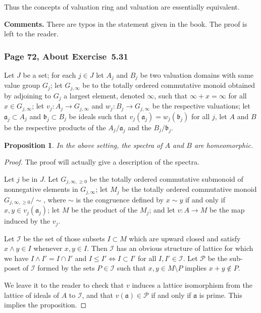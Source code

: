 \documentclass[12pt,letterpaper]{article}%
\newcommand{\mf}{\mathfrak}
\newcommand{\aaa}{\mf a}
\newcommand{\bbb}{\mf b}
\newcommand{\nn}{\noindent}
\newtheorem{prop}[thm]{Proposition}
\begin{document}
Thus the concepts of valuation ring and valuation are essentially equivalent.

\nn\textbf{Comments.} There are typos in the statement given in the book. The proof is left to the reader.

\subsubsection{Page 72, About Exercise~5.31}%

Let $J$ be a set; for each $j\in J$ let $A_j$ and $B_j$ be two valuation domains with same value group $G_j$; let $G_{j,\infty}$ be to the totally ordered commutative monoid obtained by adjoining to $G_j$ a largest element, denoted $\infty$, such that $\infty+x=\infty$ for all $x\in G_{j,\infty}$; let $v_j:A_j\to G_{j,\infty}$ and $w_j:B_j\to G_{j,\infty}$ be the respective valuations; let $\aaa_j\subset A_j$ and $\bbb_j\subset B_j$ be ideals such that $v_j(\aaa_j)=w_j(\bbb_j)$ for all $j$, let $A$ and $B$ be the respective products of the $A_j/\aaa_j$ and the $B_j/\bbb_j$.

\begin{prop}
In the above setting, the spectra of $A$ and $B$ are homeomorphic.
\end{prop}

\begin{proof}
The proof will actually give a description of the spectra. 

Let $j$ be in $J$. Let $G_{j,\infty,\ge0}$ be the totally ordered commutative submonoid of nonnegative elements in $G_{j,\infty}$; let $M_j$ be the totally ordered commutative monoid $G_{j,\infty,\ge0}/\!\sim$, where $\sim$ is the congruence defined by $x\sim y$ if and only if $x,y\in v_j(\aaa_j)$; let $M$ be the product of the $M_j$; and let $v:A\to M$ be the map induced by the $v_j$. 

Let $\mathcal I$ be the set of those subsets $I\subset M$ which are upward closed and satisfy $x\land y\in I$ whenever $x,y\in I$. Then $\mathcal I$ has an obvious structure of lattice for which we have $I\land I'=I\cap I'$ and $I\le I'\iff I\subset I'$ for all $I,I'\in\mathcal I$. Let $\mathcal P$ be the sub-poset of $\mathcal I$ formed by the sets $P\in\mathcal I$ such that $x,y\in M\setminus P$ implies $x+y\notin P$.

We leave it to the reader to check that $v$ induces a lattice isomorphism from the lattice of ideals of $A$ to $\mathcal I$, and that $v(\aaa)\in\mathcal P$ if and only if $\aaa$ is prime. This implies the proposition. 
\end{proof}
\end{document}
